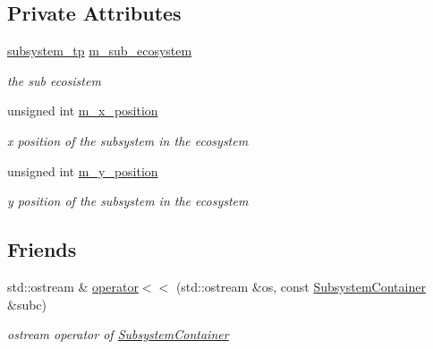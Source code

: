\subsection*{Private Attributes}
\begin{DoxyCompactItemize}
\item 
\hyperlink{classSubsystemContainer_a2c517c44fccdecc58869c24ab6d3f667}{subsystem\_\-tp} \hyperlink{classSubsystemContainer_aa85642dac44badafe0d6694c4e7893aa}{m\_\-sub\_\-ecosystem}
\begin{DoxyCompactList}\small\item\em the sub ecosistem \end{DoxyCompactList}\item 
\hypertarget{classSubsystemContainer_a2e69cbf8b4bb99b55020829c2036bcc8}{
unsigned int \hyperlink{classSubsystemContainer_a2e69cbf8b4bb99b55020829c2036bcc8}{m\_\-x\_\-position}}
\label{classSubsystemContainer_a2e69cbf8b4bb99b55020829c2036bcc8}

\begin{DoxyCompactList}\small\item\em x position of the subsystem in the ecosystem \end{DoxyCompactList}\item 
\hypertarget{classSubsystemContainer_afca7441a379efcea7d8b26a5ffa952a9}{
unsigned int \hyperlink{classSubsystemContainer_afca7441a379efcea7d8b26a5ffa952a9}{m\_\-y\_\-position}}
\label{classSubsystemContainer_afca7441a379efcea7d8b26a5ffa952a9}

\begin{DoxyCompactList}\small\item\em y position of the subsystem in the ecosystem \end{DoxyCompactList}\end{DoxyCompactItemize}
\subsection*{Friends}
\begin{DoxyCompactItemize}
\item 
std::ostream \& \hyperlink{classSubsystemContainer_acadf383984be65d380d82f1696afcd8a}{operator$<$$<$} (std::ostream \&os, const \hyperlink{classSubsystemContainer}{SubsystemContainer} \&subc)
\begin{DoxyCompactList}\small\item\em ostream operator of \hyperlink{classSubsystemContainer}{SubsystemContainer} \end{DoxyCompactList}\end{DoxyCompactItemize}



